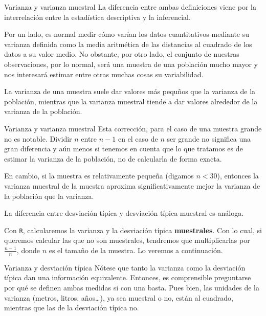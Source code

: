 \documentclass[
  ignorenonframetext,
  aspectratio=169]{beamer}
\begin{document}
\begin{frame}{Varianza y varianza muestral}
\label{varianza-y-varianza-muestral}
La diferencia entre ambas definiciones viene por la interrelación entre
la estadística descriptiva y la inferencial.

Por un lado, es normal medir cómo varían los datos cuantitativos
mediante su varianza definida como la media aritmética de las distancias
al cuadrado de los datos a su valor medio. No obstante, por otro lado,
el conjunto de nuestras observaciones, por lo normal, será una muestra
de una población mucho mayor y nos interesará estimar entre otras muchas
cosas su variabilidad.

La varianza de una muestra suele dar valores más pequños que la varianza
de la población, mientras que la varianza muestral tiende a dar valores
alrededor de la varianza de la población.
\end{frame}

\begin{frame}[fragile]{Varianza y varianza muestral}
\label{varianza-y-varianza-muestral-1}
Esta corrección, para el caso de una muestra grande no es notable.
Dividir \(n\) entre \(n-1\) en el caso de \(n\) ser grande no significa
una gran diferencia y aún menos si tenemos en cuenta que lo que tratamos
es de estimar la varianza de la población, no de calcularla de forma
exacta.

En cambio, si la muestra es relativamente pequeña (digamos \(n<30\)),
entonces la varianza muestral de la muestra aproxima significativamente
mejor la varianza de la población que la varianza.

La diferencia entre desviación típica y desviación típica muestral es
análoga.

Con \texttt{R}, calcularemos la varianza y la desviación típica
\textbf{muestrales}. Con lo cual, si queremos calcular las que no son
muestrales, tendremos que multiplicarlas por \(\frac{n-1}{n}\), donde
\(n\) es el tamaño de la muestra. Lo veremos a continuación.
\end{frame}

\begin{frame}{Varianza y desviación típica}
\label{varianza-y-desviaciuxf3n-tuxedpica}
Nótese que tanto la varianza como la desviación típica dan una
información equivalente. Entonces, es comprensible preguntarse por qué
se definen ambas medidas si con una basta. Pues bien, las unidades de la
varianza (metros, litros, años\ldots), ya sea muestral o no, están al
cuadrado, mientras que las de la desviación típica no.
\end{frame}
\end{document}
